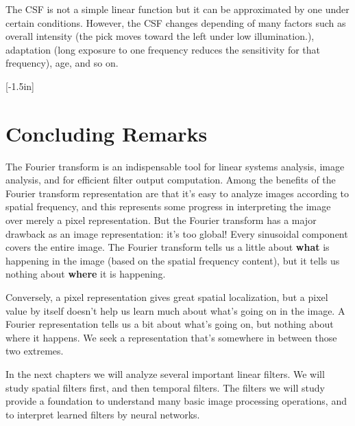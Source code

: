 The CSF is not a simple linear function but it can be approximated by one under certain conditions. However, the CSF changes depending of many factors such as overall intensity (the pick moves toward the left under low illumination.), adaptation (long exposure to one frequency reduces the sensitivity for that frequency), age, and so on.

[-1.5in]


\section{Concluding Remarks}

The Fourier transform is an indispensable tool for linear systems analysis,
image analysis, and for efficient filter output computation.
Among the benefits of the Fourier transform representation are that it's easy
to analyze images according to spatial frequency, and this represents some progress in interpreting the image over merely a pixel representation.  But the Fourier transform has a major drawback
as an image representation: it's too global!  Every sinusoidal
component covers the entire image.  The Fourier transform tells us a
little about {\bf what} is happening in the image (based on the spatial
frequency content), but it tells us nothing about {\bf where} it is happening.

Conversely, a pixel representation gives great spatial localization, but a pixel value by itself doesn't help us learn much about what's going on in the image.  A Fourier representation tells us a bit about what's going on, but nothing about where it happens.  We seek a representation that's somewhere in between those two extremes.

In the next chapters we will analyze several important linear filters. We will study spatial filters first, and then temporal filters. The filters we will study provide a foundation to understand many basic image processing operations, and to interpret learned filters by neural networks.

